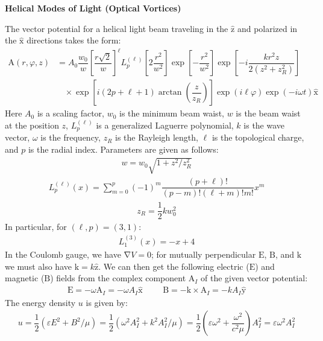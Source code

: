 \documentclass[10pt]{article}
\newcommand{\psl}{6pt} %
\newcommand{\f}[2]{\dfrac{#1}{#2}} %
\newcommand{\p}[1]{\left(#1\right)} %
\renewcommand{\sp}[1]{\left[#1\right]} %
\renewcommand{\epsilon}{\varepsilon} %
\renewcommand{\phi}{\varphi} %
\renewcommand{\v}[1]{\boldsymbol{\mathrm{#1}}} %
\newcommand{\uv}[1]{\hat{\boldsymbol{\mathrm{#1}}}} %
\newcommand{\del}{\v\nabla} %
\begin{document}
\titlespacing{\section}{0pt}{\psl}{0pt}
\begin{center}
  \large \bf Helical Modes of Light (Optical Vortices)
\end{center}

The vector potential for a helical light beam traveling in the $\uv z$
and polarized in the $\uv x$ directions takes the form:
\begin{align*}
  \v A\p{r,\phi,z}&=A_0\f{w_0}{w}\sp{\f{r\sqrt 2}{w}}^\ell
  L^{\p{\ell}}_p\sp{2\f{r^2}{w^2}}\exp\sp{-\f{r^2}{w^2}}
  \exp\sp{-i\f{kr^2z}{2\p{z^2+z_R^2}}} \\
  &~~~~\times\exp\sp{i\p{2p+\ell+1}\arctan\p{\f z{z_R}}}
  \exp\p{i\ell\phi}\exp\p{-i\omega t} \uv x
\end{align*}
Here $A_0$ is a scaling factor, $w_0$ is the minimum beam waist, $w$
is the beam waist at the position $z$, $L^{\p{\ell}}_p$ is a
generalized Laguerre polynomial, $k$ is the wave vector, $\omega$ is
the frequency, $z_R$ is the Rayleigh length, $\ell$ is the topological
charge, and $p$ is the radial index. Parameters are given as follows:
\begin{align*}
  w=w_0\sqrt{1+z^2/z_R^2}
\end{align*}
\begin{align*}
  L^{\p{\ell}}_p\p{x}
  =\sum_{m=0}^p\p{-1}^m\f{\p{p+\ell}!}{\p{p-m}!\p{\ell+m}!m!}x^m
\end{align*}
\begin{align*}
  z_R=\f12 kw_0^2
\end{align*}
In particular, for $\p{\ell,p}=\p{3,1}$:
\begin{align*}
  L^{\p{3}}_1\p{x}=-x+4
\end{align*}
In the Coulomb gauge, we have $\del V=0$; for mutually perpendicular
$\v E$, $\v B$, and $\v k$ we must also have $\v k=k\uv z$. We can
then get the following electric ($\v E$) and magnetic ($\v B$) fields
from the complex component $\v A_I$ of the given vector potential:
\begin{align*}
  \v E=-\omega\v A_I=-\omega A_I\uv x &&& \v B=-\v k\times\v
  A_I=-kA_I\uv y
\end{align*}
The energy density $u$ is given by:
\begin{align*}
  u=\f12\p{\epsilon E^2+B^2/\mu} =\f12\p{\omega^2A_I^2+k^2A_I^2/\mu}
  =\f12\p{\epsilon\omega^2+\f{\omega^2}{c^2\mu}}A_I^2
  =\epsilon\omega^2A_I^2
\end{align*}
\end{document}

